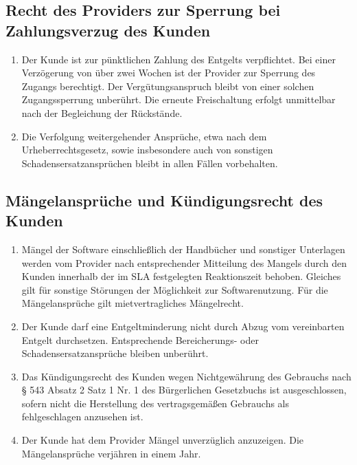 \documentclass{terms}
\begin{document}
\subsection{Recht des Providers zur Sperrung bei Zahlungsverzug des Kunden}
\begin{enumerate}
\item Der Kunde ist zur pünktlichen Zahlung des Entgelts verpflichtet. Bei einer Verzögerung von über zwei Wochen ist der Provider zur Sperrung des Zugangs berechtigt. Der Vergütungsanspruch bleibt von einer solchen Zugangssperrung unberührt. Die erneute Freischaltung erfolgt unmittelbar nach der Begleichung der Rückstände.
\item Die Verfolgung weitergehender Ansprüche, etwa nach dem Urheberrechtsgesetz, sowie insbesondere auch von sonstigen Schadensersatzansprüchen bleibt in allen Fällen vorbehalten.
\end{enumerate}

\subsection{Mängelansprüche und Kündigungsrecht des Kunden}
\begin{enumerate}
\item Mängel der Software einschließlich der Handbücher und sonstiger Unterlagen werden vom Provider nach entsprechender Mitteilung des Mangels durch den Kunden innerhalb der im SLA festgelegten Reaktionszeit behoben. Gleiches gilt für sonstige Störungen der Möglichkeit zur Softwarenutzung. Für die Mängelansprüche gilt mietvertragliches Mängelrecht.
\item Der Kunde darf eine Entgeltminderung nicht durch Abzug vom vereinbarten Entgelt durchsetzen. Entsprechende Bereicherungs- oder Schadensersatzansprüche bleiben unberührt.
\item Das Kündigungsrecht des Kunden wegen Nichtgewährung des Gebrauchs nach § 543 Absatz 2 Satz 1 Nr. 1 des Bürgerlichen Gesetzbuchs ist ausgeschlossen, sofern nicht die Herstellung des vertragsgemäßen Gebrauchs als fehlgeschlagen anzusehen ist.
\item Der Kunde hat dem Provider Mängel unverzüglich anzuzeigen. Die Mängelansprüche verjähren in einem Jahr.
\end{enumerate}
\end{document}
